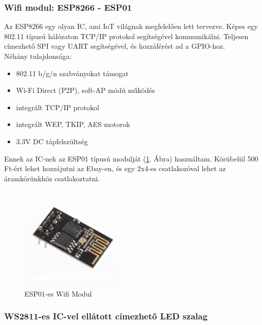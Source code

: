 \documentclass[../main.tex]{subfiles}
\begin{document}
        \subsubsection{Wifi modul: ESP8266 - ESP01} 
            Az ESP8266 egy olyan IC, ami IoT világnak megfelelően lett tervezve. Képes egy 802.11 típusú hálózaton TCP/IP protokol segítségével kommunikálni. Teljesen címezhető SPI vagy UART segítségével, és hozzáférést ad a GPIO-hoz.\cite{sec_201} \\[12px]
            Néhány tulajdonsága:
            \begin{itemize}
                \item 802.11 b/g/n szabványokat támogat
                \item Wi-Fi Direct (P2P), soft-AP módú működés
                \item integrált TCP/IP protokol
                \item integrált WEP, TKIP, AES motorok
                \item 3.3V DC tápfelszültség
            \end{itemize}
            
            Ennek az IC-nek az ESP01 típusú modulját (\ref{fig:esp01}. Ábra) használtam. Körübelül 500 Ft-ért lehet hozzájutni az Ebay-en, és egy 2x4-es csatlakozóval lehet az áramkörünkhöz csatlakoztatni.
            
            \begin{figure}[h!]
                \centering
                    \includegraphics[width=5cm]{resources/pcb_res/esp01.jpg}
                \caption{ESP01-es Wifi Modul\cite{sec_201}}
                \label{fig:esp01}
            \end{figure}
        
        \subsubsection{WS2811-es IC-vel ellátott címezhető LED szalag}
            
\end{document}
